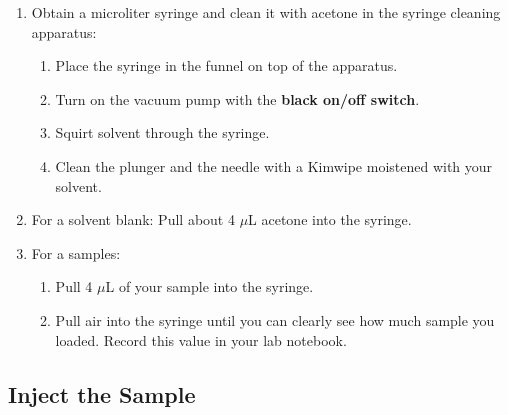 \documentclass[]{tufte-book}
\providecommand{\tightlist}{%
  \setlength{\itemsep}{0pt}\setlength{\parskip}{0pt}}
\begin{document}
\begin{enumerate}
\def\labelenumi{\arabic{enumi}.}
\tightlist
\item
  Obtain a microliter syringe and clean it with acetone in the syringe cleaning apparatus:

  \begin{enumerate}
  \def\labelenumii{\arabic{enumii}.}
  \tightlist
  \item
    Place the syringe in the funnel on top of the apparatus.\\
  \item
    Turn on the vacuum pump with the \textbf{black on/off switch}.\\
  \item
    Squirt solvent through the syringe.\\
  \item
    Clean the plunger and the needle with a Kimwipe moistened with your solvent.\\
  \end{enumerate}
\item
  For a solvent blank: Pull about 4 \(\mu\)L acetone into the syringe.\\
\item
  For a samples:

  \begin{enumerate}
  \def\labelenumii{\arabic{enumii}.}
  \tightlist
  \item
    Pull 4 \(\mu\)L of your sample into the syringe.
  \item
    Pull air into the syringe until you can clearly see how much sample you loaded. Record this value in your lab notebook.
  \end{enumerate}
\end{enumerate}

\hypertarget{inject-the-sample}{%
\subsection{Inject the Sample}\label{inject-the-sample}}
\end{document}
